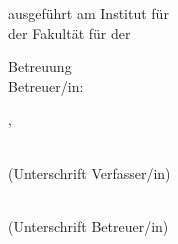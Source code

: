\begin{titlepage}
\begin{center}
  \end{center}

  \vfill

  \noindent ausgef\"{u}hrt am Institut f\"{u}r \thesisinstitute\\
  der Fakult\"{a}t f\"{u}r \thesisfaculty{} der \thesisuniversity\\

  \vspace{0.6cm}

  \noindent Betreuung\\
  Betreuer/in: \thesissupervisor{}\\

  \vspace{1.1cm}
  \noindent \thesisplace{}, \thesisdate \hspace{1cm}%
  \begin{minipage}[t]{5cm}%
    \flushleft%
    \hrulefill\\ (Unterschrift Verfasser/in)%
  \end{minipage}%
  \hspace{1cm}%
  \begin{minipage}[t]{5cm}
    \flushleft%
    \hrulefill\\ (Unterschrift Betreuer/in)%
  \end{minipage}
    
  \endgroup
  
\end{titlepage}
